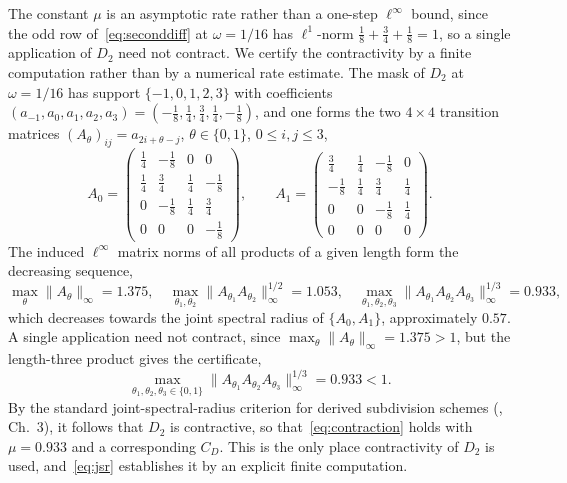 \documentclass{article}
\theoremstyle{plain}
\theoremstyle{definition}
\newcommand{\norm}[1]{\lVert #1 \rVert}
\begin{document}
The constant $\mu$ is an asymptotic rate rather than a one-step $\ell^\infty$
bound, since the odd row of~\eqref{eq:seconddiff} at $\omega=1/16$ has
$\ell^1$-norm $\tfrac18+\tfrac34+\tfrac18=1$, so a single application of $D_2$
need not contract. We certify the contractivity by a finite computation rather
than by a numerical rate estimate. The mask of $D_2$ at $\omega=1/16$ has support
$\{-1,0,1,2,3\}$ with coefficients
$(a_{-1},a_0,a_1,a_2,a_3)=(-\tfrac18,\tfrac14,\tfrac34,\tfrac14,-\tfrac18)$, and
one forms the two $4\times4$ transition matrices $(A_\theta)_{ij}=a_{2i+\theta-j}$,
$\theta\in\{0,1\}$, $0\le i,j\le3$,
\begin{equation}\label{eq:A0A1}
  A_0=\begin{pmatrix}
    \tfrac14 & -\tfrac18 & 0 & 0\\[2pt]
    \tfrac14 & \tfrac34 & \tfrac14 & -\tfrac18\\[2pt]
    0 & -\tfrac18 & \tfrac14 & \tfrac34\\[2pt]
    0 & 0 & 0 & -\tfrac18
  \end{pmatrix},
  \qquad
  A_1=\begin{pmatrix}
    \tfrac34 & \tfrac14 & -\tfrac18 & 0\\[2pt]
    -\tfrac18 & \tfrac14 & \tfrac34 & \tfrac14\\[2pt]
    0 & 0 & -\tfrac18 & \tfrac14\\[2pt]
    0 & 0 & 0 & 0
  \end{pmatrix}.
\end{equation}
The induced $\ell^\infty$ matrix norms of all products of a given length form
the decreasing sequence,
\begin{equation}\label{eq:jsrseq}
  \max_{\theta}\norm{A_\theta}_\infty = 1.375,\quad
  \max_{\theta_1,\theta_2}\norm{A_{\theta_1}A_{\theta_2}}_\infty^{1/2}=1.053,\quad
  \max_{\theta_1,\theta_2,\theta_3}\norm{A_{\theta_1}A_{\theta_2}A_{\theta_3}}_\infty^{1/3}=0.933,
\end{equation}
which decreases towards the joint spectral radius of $\{A_0,A_1\}$, approximately
$0.57$. A single application need not contract, since
$\max_\theta\norm{A_\theta}_\infty=1.375>1$, but the length-three product gives
the certificate,
\begin{equation}\label{eq:jsr}
  \max_{\theta_1,\theta_2,\theta_3\in\{0,1\}}
  \norm{A_{\theta_1}A_{\theta_2}A_{\theta_3}}_\infty^{1/3}
  = 0.933 < 1 .
\end{equation}
By the standard joint-spectral-radius criterion for derived subdivision schemes
(\cite{Dyn92}, Ch.~3), it follows that $D_2$ is contractive, so
that~\eqref{eq:contraction} holds with $\mu=0.933$ and a corresponding $C_D$.
This is the only place contractivity of $D_2$ is used, and~\eqref{eq:jsr}
establishes it by an explicit finite computation.
\end{document}
